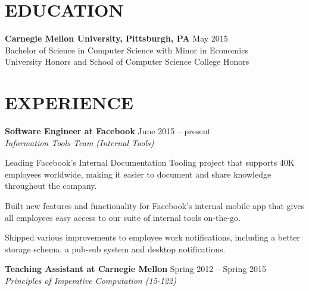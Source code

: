 \documentclass[margin, 11pt]{res} %
\begin{document}
\begin{resume}


\section{EDUCATION}

{\bf Carnegie Mellon University, Pittsburgh, PA} \hfill {\small May 2015}\\
{\small Bachelor of Science in Computer Science with Minor in Economics} \\
{\small University Honors and School of Computer Science College Honors}



\section{EXPERIENCE}

{\bf Software Engineer at Facebook} \hfill {\small June 2015 -- present}\\
{\small {\sl Information Tools Team (Internal Tools)}}
\begin{itemize} \itemsep -2pt
{\small \item Leading Facebook's Internal Documentation Tooling project that supports 40K employees worldwide, making it easier to document and share knowledge throughout the company.}
{\small \item Built new features and functionality for Facebook's internal mobile app that gives all employees easy access to our suite of internal tools on-the-go.}
{\small \item Shipped various improvements to employee work notifications, including a better storage schema, a pub-sub system and desktop notifications.}
\end{itemize}
\vspace{3pt}

{\bf Teaching Assistant at Carnegie Mellon} \hfill {\small Spring 2012 -- Spring 2015}\\
{\small {\sl Principles of Imperative Computation (15-122)}}


\end{resume}
\end{document}
